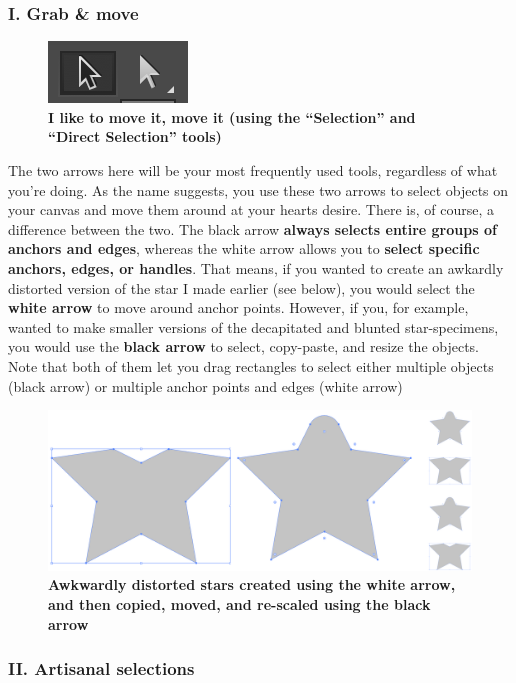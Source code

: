 \documentclass[]{article}
\begin{document}
\subsubsection{I. Grab \& move}\label{i.-grab-move}

\begin{figure}
\centering
\includegraphics{ToolI.png}
\caption{\textbf{I like to move it, move it (using the ``Selection'' and
``Direct Selection'' tools)}}
\end{figure}

The two arrows here will be your most frequently used tools, regardless
of what you're doing. As the name suggests, you use these two arrows to
select objects on your canvas and move them around at your hearts
desire. There is, of course, a difference between the two. The black
arrow \textbf{always selects entire groups of anchors and edges},
whereas the white arrow allows you to \textbf{select specific anchors,
edges, or handles}. That means, if you wanted to create an awkardly
distorted version of the star I made earlier (see below), you would
select the \textbf{white arrow} to move around anchor points. However,
if you, for example, wanted to make smaller versions of the decapitated
and blunted star-specimens, you would use the \textbf{black arrow} to
select, copy-paste, and resize the objects. Note that both of them let
you drag rectangles to select either multiple objects (black arrow) or
multiple anchor points and edges (white arrow)

\begin{figure}
\centering
\includegraphics{starseries.png}
\caption{\textbf{Awkwardly distorted stars created using the white
arrow, and then copied, moved, and re-scaled using the black arrow}}
\end{figure}

\subsubsection{II. Artisanal selections}\label{ii.-artisanal-selections}
\end{document}
